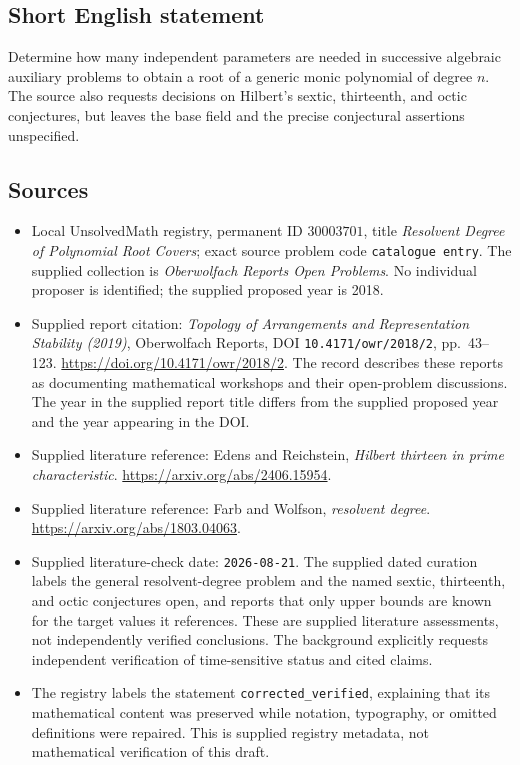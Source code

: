 \documentclass[11pt]{article}
\begin{document}
\subsection{Short English statement}
Determine how many independent parameters are needed in successive algebraic auxiliary problems to obtain a root of a generic monic polynomial of degree \(n\). The source also requests decisions on Hilbert's sextic, thirteenth, and octic conjectures, but leaves the base field and the precise conjectural assertions unspecified.
\subsection{Sources}
\begin{itemize}
\item Local UnsolvedMath registry, permanent ID \(30003701\), title \emph{Resolvent Degree of Polynomial Root Covers}; exact source problem code \texttt{catalogue entry}. The supplied collection is \emph{Oberwolfach Reports Open Problems}. No individual proposer is identified; the supplied proposed year is 2018.
\item Supplied report citation: \emph{Topology of Arrangements and Representation Stability (2019)}, Oberwolfach Reports, DOI \texttt{10.4171/owr/2018/2}, pp.\ 43--123. \url{https://doi.org/10.4171/owr/2018/2}. The record describes these reports as documenting mathematical workshops and their open-problem discussions. The year in the supplied report title differs from the supplied proposed year and the year appearing in the DOI.
\item Supplied literature reference: Edens and Reichstein, \emph{Hilbert thirteen in prime characteristic}. \url{https://arxiv.org/abs/2406.15954}.
\item Supplied literature reference: Farb and Wolfson, \emph{resolvent degree}. \url{https://arxiv.org/abs/1803.04063}.
\item Supplied literature-check date: \texttt{2026-08-21}. The supplied dated curation labels the general resolvent-degree problem and the named sextic, thirteenth, and octic conjectures open, and reports that only upper bounds are known for the target values it references. These are supplied literature assessments, not independently verified conclusions. The background explicitly requests independent verification of time-sensitive status and cited claims.
\item The registry labels the statement \texttt{corrected\_verified}, explaining that its mathematical content was preserved while notation, typography, or omitted definitions were repaired. This is supplied registry metadata, not mathematical verification of this draft.
\end{itemize}
\end{document}
